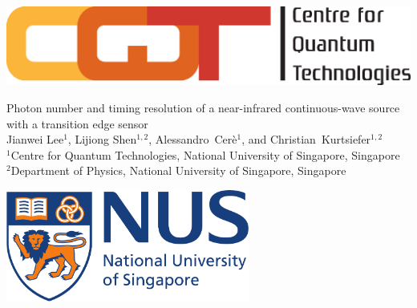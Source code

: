 \documentclass[portrait,a0,final]{a0poster}
\newenvironment{poster}{
  \begin{center}
  \begin{minipage}[c]{0.98\textwidth}
}{
  \end{minipage}
  \end{center}
}
\begin{document}
\begin{poster}
\large \sf

\begin{center}

      \begin{minipage}[c]{0.05\textwidth}
        \begin{center}
          \includegraphics[width=14cm,angle=0]{figures/CQT_Logo}
        \end{center}
      \end{minipage}\hspace{10cm}
      \begin{minipage}[c]{0.7\textwidth}
        \begin{center}
          {\sc \huge
          Photon number and timing resolution of a near-infrared continuous-wave source with a transition edge sensor}\\[9mm]
          {\large Jianwei Lee$^1$,
          Lijiong Shen$^{1,2}$,
          Alessandro~Cer\`e$^1$,
          and Christian~Kurtsiefer$^{1,2}$}\\[9mm]
          {$^1$Centre for Quantum Technologies, National University of Singapore, Singapore\\
           $^2$Department of Physics, National University of Singapore, Singapore}
        \end{center}
      \end{minipage}
      \begin{minipage}[c]{.1\textwidth}
        \begin{center}
          \includegraphics[width=8cm,angle=0]{figures/NUS_Logo.pdf}
        \end{center}
      \end{minipage}
\end{center}


\end{poster}
\end{document}
